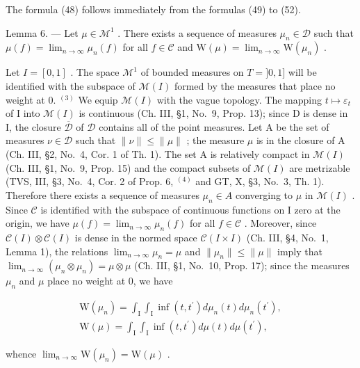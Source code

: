 The formula (48) follows immediately from the formulas (49) to (52).

Lemma 6. --- Let \(\mu \in \mathcal{M}^1\) . There exists a sequence of measures \(\mu_n \in \mathcal{D}\) such that \(\mu(f) = \lim_{n \to \infty} \mu_n(f)\) for all \(f \in \mathcal{C}\) and \(\mathrm{W}(\mu) = \lim_{n \to \infty} \mathrm{W}(\mu_n)\) .

Let \(I = [0,1]\) . The space \(\mathcal{M}^1\) of bounded measures on \(T = ]0,1]\) will be identified with the subspace of \(\mathcal{M}(I)\) formed by the measures that place no weight at 0. \(^{(3)}\) We equip \(\mathcal{M}(I)\) with the vague topology. The mapping \(t \mapsto \varepsilon_t\) of I into \(\mathcal{M}(I)\) is continuous (Ch. III, §1, No.~9, Prop. 13); since D is dense in I, the closure \(\overline{\mathcal{D}}\) of \(\mathcal{D}\) contains all of the point measures. Let A be the set of measures \(\nu \in \mathcal{D}\) such that \(\| \nu \| \leqslant \| \mu \|\) ; the measure \(\mu\) is in the closure of A (Ch. III, §2, No.~4, Cor. 1 of Th. 1). The set A is relatively compact in \(\mathcal{M}(I)\) (Ch. III, §1, No.~9, Prop. 15) and the compact subsets of \(\mathcal{M}(I)\) are metrizable (TVS, III, §3, No.~4, Cor. 2 of Prop. 6, \(^{(4)}\) and GT, X, §3, No.~3, Th. 1). Therefore there exists a sequence of measures \(\mu_n \in A\) converging to \(\mu\) in \(\mathcal{M}(I)\) . Since \(\mathcal{C}\) is identified with the subspace of continuous functions on I zero at the origin, we have \(\mu(f) = \lim_{n \to \infty} \mu_n(f)\) for all \(f \in \mathcal{C}\) . Moreover, since \(\mathcal{C}(I) \otimes \mathcal{C}(I)\) is dense in the normed space \(\mathcal{C}(I \times I)\) (Ch. III, §4, No.~1, Lemma 1), the relations \(\lim_{n \to \infty} \mu_n = \mu\) and \(\| \mu_n \| \leqslant \| \mu \|\) imply that \(\lim_{n \to \infty} (\mu_n \otimes \mu_n) = \mu \otimes \mu\) (Ch. III, §1, No.~10, Prop. 17); since the measures \(\mu_n\) and \(\mu\) place no weight at 0, we have

\[
\begin{array}{r} \mathrm{W} (\mu_ {n}) = \int_ {\mathrm{I}} \int_ {\mathrm{I}} \inf (t, t ^ {\prime}) d \mu_ {n} (t) d \mu_ {n} (t ^ {\prime}), \\ \mathrm{W} (\mu) = \int_ {\mathrm{I}} \int_ {\mathrm{I}} \inf (t, t ^ {\prime}) d \mu (t) d \mu (t ^ {\prime}), \end{array}
\]

whence \(\lim_{n\to \infty}\mathrm{W}(\mu_n) = \mathrm{W}(\mu)\) .


